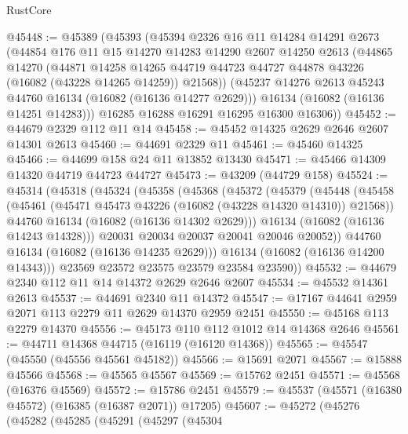 \begin{lexlean}{RustCore}
\begin{coremodule}
@45448 := @45389
    (@45393
      (@45394
        @2326
        @16
        @11
        @14284
        @14291
        @2673
        (@44854
          @176
          @11
          @15
          @14270
          @14283
          @14290
          @2607
          @14250
          @2613
          (@44865
            @14270
            (@44871
              @14258
              @14265
              @44719
              @44723
              @44727
              @44878
              @43226
              (@16082 (@43228 @14265 @14259))
              @21568))
          (@45237 @14276 @2613 @45243 @44760 @16134 (@16082 (@16136 @14277 @2629)))
          @16134
          (@16082 (@16136 @14251 @14283)))
        @16285
        @16288
        @16291
        @16295
        @16300
        @16306))
@45452 := @44679 @2329 @112 @11 @14
@45458 := @45452 @14325 @2629 @2646 @2607 @14301 @2613
@45460 := @44691 @2329 @11
@45461 := @45460 @14325
@45466 := @44699 @158 @24 @11 @13852 @13430
@45471 := @45466 @14309 @14320 @44719 @44723 @44727
@45473 := @43209 (@44729 @158)
@45524 := @45314
    (@45318
      (@45324
        (@45358
          (@45368
            (@45372
              (@45379
                (@45448
                  (@45458
                    (@45461 (@45471 @45473 @43226 (@16082 (@43228 @14320 @14310)) @21568))
                    @44760
                    @16134
                    (@16082 (@16136 @14302 @2629)))
                  @16134
                  (@16082 (@16136 @14243 @14328)))
                @20031
                @20034
                @20037
                @20041
                @20046
                @20052))
            @44760
            @16134
            (@16082 (@16136 @14235 @2629)))
          @16134
          (@16082 (@16136 @14200 @14343)))
        @23569
        @23572
        @23575
        @23579
        @23584
        @23590))
@45532 := @44679 @2340 @112 @11 @14 @14372 @2629 @2646 @2607
@45534 := @45532 @14361 @2613
@45537 := @44691 @2340 @11 @14372
@45547 := @17167 @44641 @2959 @2071 @113 @2279 @11 @2629 @14370 @2959 @2451
@45550 := @45168 @113 @2279 @14370
@45556 := @45173 @110 @112 @1012 @14 @14368 @2646
@45561 := @44711 @14368 @44715 (@16119 (@16120 @14368))
@45565 := @45547 (@45550 (@45556 @45561 @45182))
@45566 := @15691 @2071
@45567 := @15888 @45566
@45568 := @45565 @45567
@45569 := @15762 @2451
@45571 := @45568 (@16376 @45569)
@45572 := @15786 @2451
@45579 := @45537 (@45571 (@16380 @45572) (@16385 (@16387 @2071)) @17205)
@45607 := @45272
    (@45276
      (@45282
        (@45285
          (@45291
            (@45297
              (@45304

\end{coremodule}
\end{lexlean}
